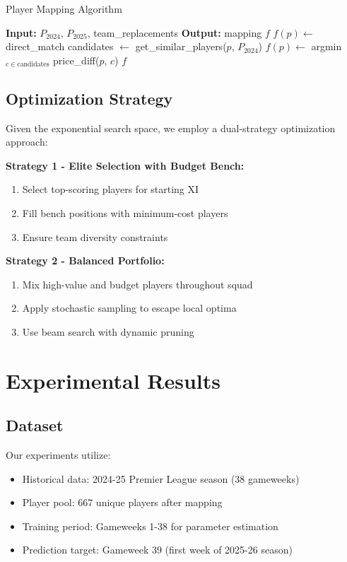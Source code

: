 \documentclass[12pt]{article}
\begin{document}
\begin{algorithm}
\caption{Player Mapping Algorithm}
\begin{algorithmic}
\STATE \textbf{Input:} $P_{2024}$, $P_{2025}$, team\_replacements
\STATE \textbf{Output:} mapping $f$
    \STATE $f(p) \leftarrow$ direct\_match
  \ELSE
    \STATE candidates $\leftarrow$ get\_similar\_players($p$, $P_{2024}$)
    \STATE $f(p) \leftarrow$ argmin$_{c \in \text{candidates}}$ price\_diff($p$, $c$)
  \ENDIF
\ENDFOR
\RETURN $f$
\end{algorithmic}
\end{algorithm}

\subsection{Optimization Strategy}

Given the exponential search space, we employ a dual-strategy optimization approach:

\textbf{Strategy 1 - Elite Selection with Budget Bench:}
\begin{enumerate}
\item Select top-scoring players for starting XI
\item Fill bench positions with minimum-cost players
\item Ensure team diversity constraints
\end{enumerate}

\textbf{Strategy 2 - Balanced Portfolio:}
\begin{enumerate}
\item Mix high-value and budget players throughout squad
\item Apply stochastic sampling to escape local optima
\item Use beam search with dynamic pruning
\end{enumerate}

\section{Experimental Results}

\subsection{Dataset}

Our experiments utilize:
\begin{itemize}
\item Historical data: 2024-25 Premier League season (38 gameweeks)
\item Player pool: 667 unique players after mapping
\item Training period: Gameweeks 1-38 for parameter estimation
\item Prediction target: Gameweek 39 (first week of 2025-26 season)
\end{itemize}
\end{document}
